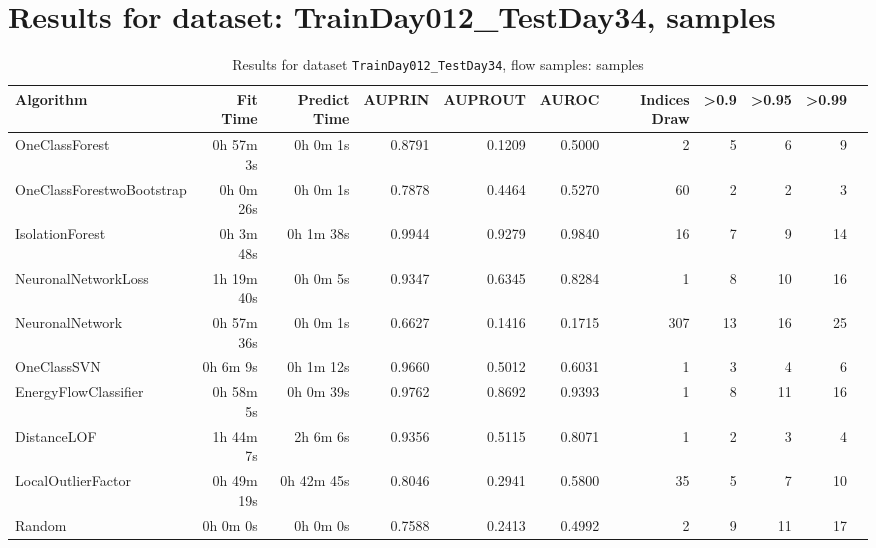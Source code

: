 \documentclass{article}
\begin{document}
\section*{Results for dataset: TrainDay012_TestDay34, samples}
\begin{table}[h!]
\centering
\caption{Results for dataset \texttt{TrainDay012_TestDay34}, flow samples: samples}
\label{tab:trainday012testday34_samples}
\begin{tabular}{lrrrrrrrrrr}
\toprule
Algorithm & Fit Time & Predict Time & AUPRIN & AUPROUT & AUROC & Indices Draw & >0.9 & >0.95 & >0.99 \\
\midrule
OneClassForest & 0h 57m 3s & 0h 0m 1s & 0.8791 & 0.1209 & 0.5000 & 2 & 5 & 6 & 9 \\
OneClassForestwoBootstrap & 0h 0m 26s & 0h 0m 1s & 0.7878 & 0.4464 & 0.5270 & 60 & 2 & 2 & 3 \\
IsolationForest & 0h 3m 48s & 0h 1m 38s & 0.9944 & 0.9279 & 0.9840 & 16 & 7 & 9 & 14 \\
NeuronalNetworkLoss & 1h 19m 40s & 0h 0m 5s & 0.9347 & 0.6345 & 0.8284 & 1 & 8 & 10 & 16 \\
NeuronalNetwork & 0h 57m 36s & 0h 0m 1s & 0.6627 & 0.1416 & 0.1715 & 307 & 13 & 16 & 25 \\
OneClassSVN & 0h 6m 9s & 0h 1m 12s & 0.9660 & 0.5012 & 0.6031 & 1 & 3 & 4 & 6 \\
EnergyFlowClassifier & 0h 58m 5s & 0h 0m 39s & 0.9762 & 0.8692 & 0.9393 & 1 & 8 & 11 & 16 \\
DistanceLOF & 1h 44m 7s & 2h 6m 6s & 0.9356 & 0.5115 & 0.8071 & 1 & 2 & 3 & 4 \\
LocalOutlierFactor & 0h 49m 19s & 0h 42m 45s & 0.8046 & 0.2941 & 0.5800 & 35 & 5 & 7 & 10 \\
Random & 0h 0m 0s & 0h 0m 0s & 0.7588 & 0.2413 & 0.4992 & 2 & 9 & 11 & 17 \\
\bottomrule
\end{tabular}
\end{table}
\end{document}
